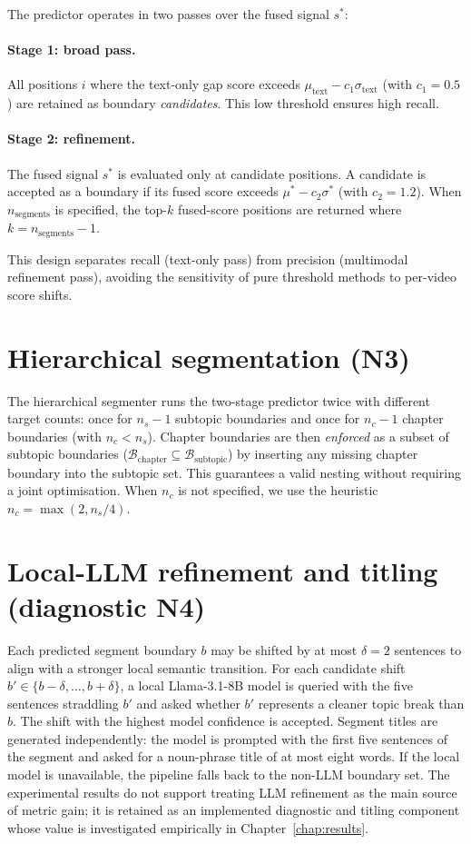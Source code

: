 The predictor operates in two passes over the fused signal $s^*$:

\paragraph{Stage 1: broad pass.}
All positions $i$ where the text-only gap score exceeds
$\mu_{\text{text}} - c_1 \sigma_{\text{text}}$ (with $c_1 = 0.5$) are
retained as boundary \emph{candidates}.
This low threshold ensures high recall.

\paragraph{Stage 2: refinement.}
The fused signal $s^*$ is evaluated only at candidate positions.
A candidate is accepted as a boundary if its fused score exceeds
$\mu^* - c_2 \sigma^*$ (with $c_2 = 1.2$).
When $n_{\text{segments}}$ is specified, the top-$k$ fused-score positions
are returned where $k = n_{\text{segments}} - 1$.

This design separates recall (text-only pass) from precision (multimodal
refinement pass), avoiding the sensitivity of pure threshold methods to
per-video score shifts.

\section{Hierarchical segmentation (N3)}
\label{sec:hierarchy}

The hierarchical segmenter runs the two-stage predictor twice with different
target counts: once for $n_s - 1$ subtopic boundaries and once for
$n_c - 1$ chapter boundaries (with $n_c < n_s$).
Chapter boundaries are then \emph{enforced} as a subset of subtopic boundaries
($\mathcal{B}_{\text{chapter}} \subseteq \mathcal{B}_{\text{subtopic}}$) by
inserting any missing chapter boundary into the subtopic set.
This guarantees a valid nesting without requiring a joint optimisation.
When $n_c$ is not specified, we use the heuristic $n_c = \max(2, n_s / 4)$.

\section{Local-LLM refinement and titling (diagnostic N4)}
\label{sec:refine}

Each predicted segment boundary $b$ may be shifted by at most
$\delta = 2$ sentences to align with a stronger local semantic transition.
For each candidate shift $b' \in \{b-\delta, \ldots, b+\delta\}$,
a local Llama-3.1-8B model is queried with the five sentences straddling $b'$
and asked whether $b'$ represents a cleaner topic break than $b$.
The shift with the highest model confidence is accepted.
Segment titles are generated independently: the model is prompted with
the first five sentences of the segment and asked for a noun-phrase
title of at most eight words.
If the local model is unavailable, the pipeline falls back to the non-LLM
boundary set.
The experimental results do not support treating LLM refinement as the
main source of metric gain; it is retained as an implemented diagnostic
and titling component whose value is investigated empirically in
Chapter~\ref{chap:results}.

